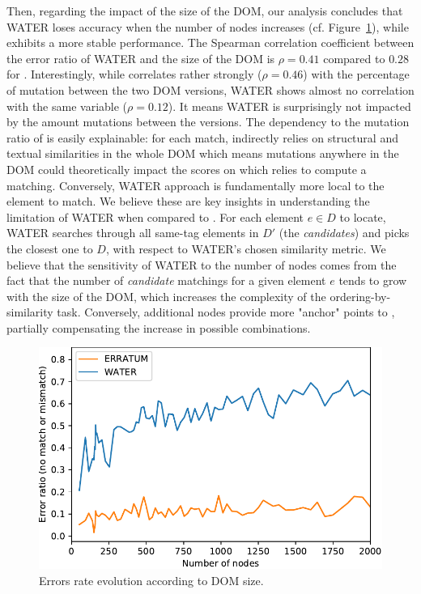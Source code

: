 \documentclass[preprint, 12pt]{elsarticle}
\begin{document}
Then, regarding the impact of the size of the DOM, our analysis concludes that
WATER loses accuracy when the number of nodes increases (cf.
Figure~\ref{fig:nbNodesAccuracy}), while \erratum{} exhibits a more stable
performance. The Spearman correlation coefficient between the error ratio of
WATER and the size of the DOM is $\rho = 0.41$ compared to $0.28$ for \erratum{}.
Interestingly, while \erratum{} correlates rather strongly ($\rho = 0.46$) with the
percentage of mutation between the two DOM versions, WATER shows almost no
correlation with the same variable ($\rho = 0.12$). It means WATER is surprisingly
not impacted by the amount mutations between the versions. The dependency to the
mutation ratio of \erratum{} is easily explainable: for each match, \erratum{}
indirectly relies on structural and textual similarities in the whole DOM which
means mutations anywhere in the DOM could theoretically impact the scores on
which \erratum{} relies to compute a matching. Conversely, WATER approach is
fundamentally more local to the element to match. We believe these are key
insights in understanding the limitation of WATER when compared to \erratum{}.
For each element $e \in D$ to locate, WATER searches through all same-tag elements
in $D'$ (the \textit{candidates}) and picks the closest one to $D$, with respect
to WATER's chosen similarity metric. We believe that the sensitivity of WATER to
the number of nodes comes from the fact that the number of \textit{candidate}
matchings for a given element $e$ tends to grow with the size of the DOM, which
increases the complexity of the ordering-by-similarity task. Conversely,
additional nodes provide more "anchor" points to \erratum, partially
compensating the increase in possible combinations.

\begin{figure}[]
  \centering
  \includegraphics[width=.8\linewidth]{mutation-numberNodes-mistake}
  \caption{Errors rate evolution according to DOM size.}
  \label{fig:nbNodesAccuracy}
\end{figure}
\end{document}
